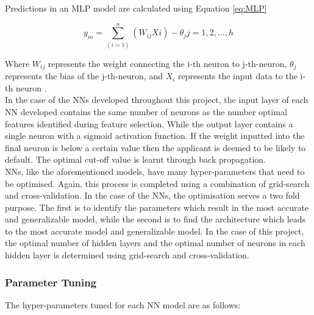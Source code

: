 Predictions in an MLP model are calculated using Equation \ref{eq:MLP}

\vspace{10pt}

\begin{equation} \label{eq:MLP}
y_m = \sum_(i=1)^{n}(W_{ij} X{i}) - \theta_j     j = 1,2,...,h
\end{equation}

\vspace{10pt}

Where $W_{ij}$ represents the weight connecting the i-th neuron to j-th-neuron, $\theta_j$ represents the bias of the j-th-neuron, and $X_i$ represents the input data to the i-th neuron \parencite{MLP}. \\

In the case of the NNs developed throughout this project, the input layer of each NN developed contains the same number of neurons as the number optimal features identified during feature selection. While the output layer contains a single neuron with a sigmoid activation function. If the weight inputted into the final neuron is below a certain value then the applicant is deemed to be likely to default. The optimal cut-off value is learnt through back propagation. \\ 

NNs, like the aforementioned models, have many hyper-parameters that need to be optimised. Again, this process is completed using a combination of grid-search and cross-validation. In the case of the NNs, the optimisation serves a two fold purpose. The first is to identify the parameters which result in the most accurate and generalizable model, while the second is to find the architecture which leads to the most accurate model and generalizable model. In the case of this project, the optimal number of hidden layers and  the optimal number of neurons in each hidden layer is determined using grid-search and cross-validation. 

\subsubsection{Parameter Tuning}

The hyper-parameters tuned for each NN model are as follows:

